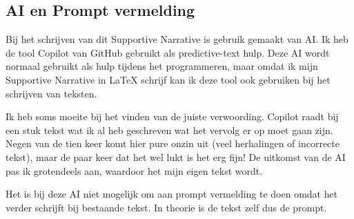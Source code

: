 

\subsection*{AI en Prompt vermelding}
Bij het schrijven van dit Supportive Narrative is gebruik gemaakt van AI. Ik heb de tool Copilot van GitHub gebruikt als predictive-text hulp. Deze AI wordt normaal gebruikt als hulp tijdens het programmeren, maar omdat ik mijn Supportive Narrative in LaTeX schrijf kan ik deze tool ook gebruiken bij het schrijven van teksten.

Ik heb soms moeite bij het vinden van de juiste verwoording. Copilot raadt bij een stuk tekst wat ik al heb geschreven wat het vervolg er op moet gaan zijn. Negen van de tien keer komt hier pure onzin uit (veel herhalingen of incorrecte tekst), maar de paar keer dat het wel lukt is het erg fijn! De uitkomst van de AI pas ik grotendeels aan, waardoor het mijn eigen tekst wordt.

Het is bij deze AI niet mogelijk om aan prompt vermelding te doen omdat het verder schrijft bij bestaande tekst. In theorie is de tekst zelf dus de prompt. 
